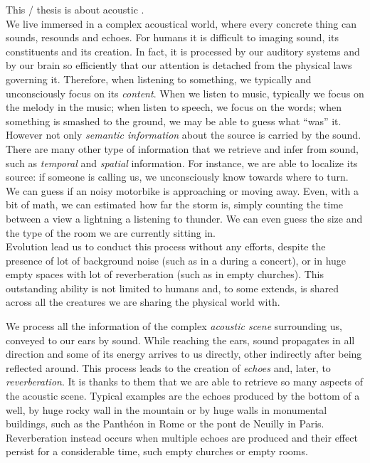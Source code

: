  This \PhD/ thesis is about acoustic
.
\\We live immersed in a complex acoustical world, where every concrete thing can sounds, resounds and echoes.
For humans it is difficult to imaging sound, its constituents and its creation.
In fact, it is processed by our auditory systems and by our brain so efficiently that our attention is detached from the physical laws governing it.
Therefore, when listening to something, we typically and unconsciously focus on its \textit{content}.
When we listen to music, typically we focus on the melody in the music; when listen to speech, we focus on the words;
when something is smashed to the ground, we may be able to guess what ``was'' it.
\\However not only \textit{semantic information} about the source is carried by the sound.
There are many other type of information that we retrieve and infer from sound, such as \textit{temporal} and \textit{spatial} information.
For instance, we are able to localize its source:
if someone is calling us, we unconsciously know towards where to turn.
We can guess if an noisy motorbike is approaching or moving away.
Even, with a bit of math, we can estimated how far the storm is, simply counting the time between a view a lightning a listening to thunder.
We can even guess the size and the type of the room we are currently sitting in.
\\Evolution lead us to conduct this process without any efforts, despite the presence of lot of background noise (such as in a during a concert),
or in huge empty spaces with lot of reverberation (such as in empty churches).
This outstanding ability is not limited to humans and, to some extends, is shared across all the creatures we are sharing the physical world with.

\mynewline
We process all the information of the complex \textit{acoustic scene} surrounding us, conveyed to our ears by sound.
While reaching the ears, sound propagates in all direction and some of its energy arrives to us directly, other indirectly after being reflected around.
This process leads to the creation of \textit{echoes} and, later, to \textit{reverberation}.
It is thanks to them that we are able to retrieve so many aspects of the acoustic scene.
Typical examples are the echoes produced by the bottom of a well, by huge rocky wall in the mountain or by huge walls in monumental buildings, such as the Panthéon in Rome or the pont de Neuilly in Paris.
Reverberation instead occurs when multiple echoes are produced and their effect persist for a considerable time, such empty churches or empty rooms.

